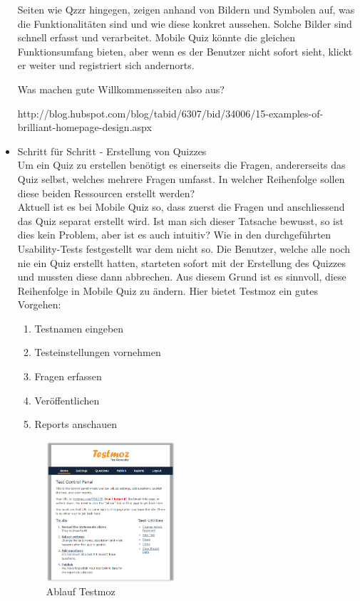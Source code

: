 \begin{itemize}
		Seiten wie Qzzr \cite{qzzr.com} hingegen, zeigen anhand von Bildern und Symbolen auf, was die Funktionalitäten sind und wie diese konkret aussehen. Solche Bilder sind schnell erfasst  und verarbeitet.
		Mobile Quiz könnte die gleichen Funktionsumfang bieten, aber wenn es der Benutzer nicht sofort sieht, klickt er weiter und registriert sich andernorts.
		
		Was machen gute Willkommensseiten also aus?
		
		http://blog.hubspot.com/blog/tabid/6307/bid/34006/15-examples-of-brilliant-homepage-design.aspx
		
		\newpage
		\item Schritt für Schritt - Erstellung von Quizzes \\
		Um ein Quiz zu erstellen benötigt es einerseits die Fragen, andererseits das Quiz selbst, welches mehrere Fragen umfasst. In welcher Reihenfolge sollen diese beiden Ressourcen erstellt werden? \\
		Aktuell ist es bei Mobile Quiz so, dass zuerst die Fragen und anschliessend das Quiz separat erstellt wird. Ist man sich dieser Tatsache bewusst, so ist dies kein Problem, aber ist es auch intuitiv? Wie in den durchgeführten Usability-Tests festgestellt war dem nicht so. Die Benutzer, welche alle noch nie ein Quiz erstellt hatten, starteten sofort mit der Erstellung des Quizzes und mussten diese dann abbrechen.
		Aus diesem Grund ist es sinnvoll, diese Reihenfolge in Mobile Quiz zu ändern. Hier bietet Testmoz \cite{testmoz.com} ein gutes Vorgehen:
		
		\begin{enumerate}
			\item Testnamen eingeben
			\item Testeinstellungen vornehmen
			\item Fragen erfassen
			\item Veröffentlichen
			\item Reports anschauen
		\end{enumerate}
		
		\begin{figure}[H]
			\centering
			\includegraphics[width=0.45\textwidth]{Images/Testmoz2.PNG}
			\caption{Ablauf Testmoz}
		\end{figure}
		

\end{itemize}
